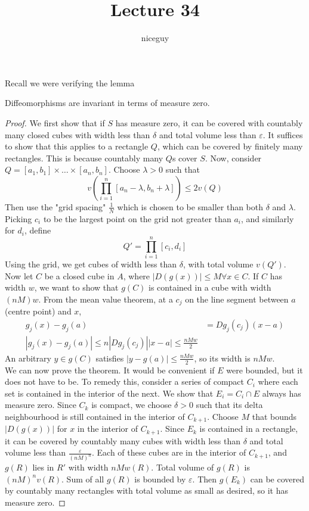 \documentclass[12pt]{article}
\title{Lecture 34}
\author{niceguy}
\begin{document}
\maketitle

Recall we were verifying the lemma

\begin{lem}
    Diffeomorphisms are invariant in terms of measure zero.
\end{lem}

\begin{proof}
    We first show that if $S$ has measure zero, it can be covered with countably many closed cubes with width less than $\delta$ and total volume less than $\varepsilon$. It suffices to show that this applies to a rectangle $Q$, which can be covered by finitely many rectangles. This is because countably many $Q$s cover $S$. Now, consider $Q = [a_1,b_1] \times \dots \times [a_n,b_n]$. Choose $\lambda > 0$ such that
    $$v\left(\prod_{i=1}^n [a_n - \lambda, b_n + \lambda]\right) \leq 2v(Q)$$
    Then use the "grid spacing" $\frac{1}{N}$ which is chosen to be smaller than both $\delta$ and $\lambda$. Picking $c_i$ to be the largest point on the grid not greater than $a_i$, and similarly for $d_i$, define
    $$Q' = \prod_{i=1}^n [c_i,d_i]$$
    Using the grid, we get cubes of width less than $\delta$, with total volume $v(Q')$. \\
    Now let $C$ be a closed cube in $A$, where $|D(g(x))| \leq M \forall x\in C$. If $C$ has width $w$, we want to show that $g(C)$ is contained in a cube with width $(nM)w$. From the mean value theorem, at a $c_j$ on the line segment between $a$ (centre point) and $x$,
    \begin{align*}
        g_j(x) - g_j(a) &= Dg_j(c_j) (x - a) \\
    |g_j(x) - g_j(a)| \leq n|Dg_j(c_j)||x-a| \leq \frac{nMw}{2}
    \end{align*}
    An arbitrary $y \in g(C)$ satisfies $|y - g(a)| \leq \frac{nMw}{2}$, so its width is $nMw$. \\
    We can now prove the theorem. It would be convenient if $E$ were bounded, but it does not have to be. To remedy this, consider a series of compact $C_i$ where each set is contained in the interior of the next. We show that $E_i = C_i \cap E$ always has measure zero. Since $C_k$ is compact, we choose $\delta > 0$ such that its delta neighbourhood is still contained in the interior of $C_{k+1}$. Choose $M$ that bounds $|D(g(x))|$ for $x$ in the interior of $C_{k+1}$. Since $E_k$ is contained in a rectangle, it can be covered by countably many cubes with width less than $\delta$ and total volume less than $\frac{\varepsilon}{(nM)^n}$. Each of these cubes are in the interior of $C_{k+1}$, and $g(R)$ lies in $R'$ with width $nMw(R)$. Total volume of $g(R)$ is $(nM)^nv(R)$. Sum of all $g(R)$ is bounded by $\varepsilon$. Then $g(E_k)$ can be covered by countably many rectangles with total volume as small as desired, so it has measure zero.
\end{proof}
\end{document}
